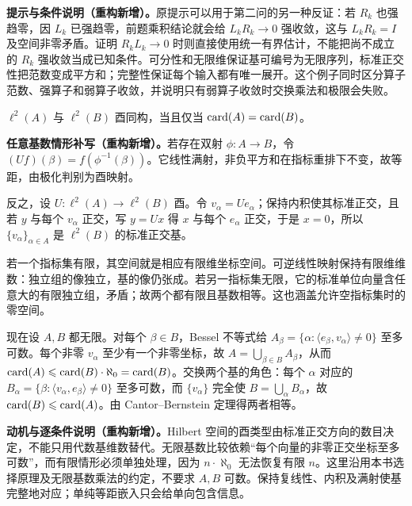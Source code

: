 \documentclass[../../main.tex]{subfiles}
\begin{document}
\begin{remark}
\textbf{提示与条件说明（重构新增）。}原提示可以用于第二问的另一种反证：若 $R_k$ 也强趋零，因 $L_k$ 已强趋零，前题乘积结论就会给 $L_kR_k\to0$ 强收敛，这与 $L_kR_k=I$ 及空间非零矛盾。证明 $R_kL_k\to0$ 时则直接使用统一有界估计，不能把尚不成立的 $R_k$ 强收敛当成已知条件。可分性和无限维保证基可编号为无限序列，标准正交性把范数变成平方和；完整性保证每个输入都有唯一展开。这个例子同时区分算子范数、强算子和弱算子收敛，并说明只有弱算子收敛时交换乘法和极限会失败。
\end{remark}
\begin{exercise}\label{exercise:ch05-hilbert-dimension}
$\ell^2(A)$ 与 $\ell^2(B)$ 酉同构，当且仅当 $\operatorname{card}(A)=\operatorname{card}(B)$。
\end{exercise}
\begin{solution}
\textbf{任意基数情形补写（重构新增）。}若存在双射 $\phi:A\to B$，令 $(Uf)(\beta)=f(\phi^{-1}(\beta))$。它线性满射，非负平方和在指标重排下不变，故等距，由极化判别为酉映射。

反之，设 $U:\ell^2(A)\to\ell^2(B)$ 酉。令 $v_\alpha=Ue_\alpha$；保持内积使其标准正交，且若 $y$ 与每个 $v_\alpha$ 正交，写 $y=Ux$ 得 $x$ 与每个 $e_\alpha$ 正交，于是 $x=0$，所以 $\{v_\alpha\}_{\alpha\in A}$ 是 $\ell^2(B)$ 的标准正交基。

若一个指标集有限，其空间就是相应有限维坐标空间。可逆线性映射保持有限维维数：独立组的像独立，基的像仍张成。若另一指标集无限，它的标准单位向量含任意大的有限独立组，矛盾；故两个都有限且基数相等。这也涵盖允许空指标集时的零空间。

现在设 $A,B$ 都无限。对每个 $\beta\in B$，Bessel 不等式给 $A_\beta=\{\alpha:\langle e_\beta,v_\alpha\rangle\ne0\}$ 至多可数。每个非零 $v_\alpha$ 至少有一个非零坐标，故 $A=\bigcup_{\beta\in B}A_\beta$，从而 $\operatorname{card}(A)\leqslant\operatorname{card}(B)\cdot\aleph_0=\operatorname{card}(B)$。交换两个基的角色：每个 $\alpha$ 对应的 $B_\alpha=\{\beta:\langle v_\alpha,e_\beta\rangle\ne0\}$ 至多可数，而 $\{v_\alpha\}$ 完全使 $B=\bigcup_\alpha B_\alpha$，故 $\operatorname{card}(B)\leqslant\operatorname{card}(A)$。由 Cantor--Bernstein 定理得两者相等。
\end{solution}
\begin{remark}
\textbf{动机与逐条件说明（重构新增）。}Hilbert 空间的酉类型由标准正交方向的数目决定，不能只用代数基维数替代。无限基数比较依赖“每个向量的非零正交坐标至多可数”，而有限情形必须单独处理，因为 $n\cdot\aleph_0$ 无法恢复有限 $n$。这里沿用本书选择原理及无限基数乘法的约定，不要求 $A,B$ 可数。保持复线性、内积及满射使基完整地对应；单纯等距嵌入只会给单向包含信息。
\end{remark}
\end{document}
